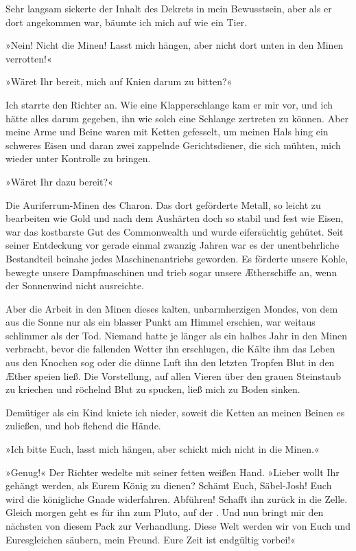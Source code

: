 Sehr langsam sickerte der Inhalt des Dekrets in mein Bewusstsein,
aber als er dort angekommen war, bäumte ich mich auf wie ein Tier.

»Nein! Nicht die Minen! Lasst mich hängen, aber nicht dort unten in
den Minen verrotten!«

»Wäret Ihr bereit, mich auf Knien darum zu bitten?«

Ich starrte den Richter an. Wie eine Klapperschlange kam er mir
vor, und ich hätte alles darum gegeben, ihn wie solch eine Schlange
zertreten zu können. Aber meine Arme und Beine waren mit Ketten
gefesselt, um meinen Hals hing ein schweres Eisen und daran zwei
zappelnde Gerichtsdiener, die sich mühten, mich wieder unter
Kontrolle zu bringen.

\bigpar

»Wäret Ihr dazu bereit?«

\bigpar

Die Auriferrum-Minen des Charon. Das dort geförderte Metall, so
leicht zu bearbeiten wie Gold und nach dem Aushärten doch so stabil
und fest wie Eisen, war das kostbarste Gut des Commonwealth und
wurde eifersüchtig gehütet. Seit seiner Entdeckung vor gerade
einmal zwanzig Jahren war es der unentbehrliche Bestandteil beinahe
jedes Maschinenantriebs geworden. Es förderte unsere Kohle, bewegte
unsere Dampfmaschinen und trieb sogar unsere Ætherschiffe an, wenn
der Sonnenwind nicht ausreichte.

Aber die Arbeit in den Minen dieses kalten, unbarmherzigen Mondes,
von dem aus die Sonne nur als ein blasser Punkt am Himmel erschien,
war weitaus schlimmer als der Tod. Niemand hatte je länger als ein
halbes Jahr in den Minen verbracht, bevor die fallenden Wetter ihn
erschlugen, die Kälte ihm das Leben aus den Knochen sog oder die
dünne Luft ihn den letzten Tropfen Blut in den Æther speien ließ.
Die Vorstellung, auf allen Vieren über den grauen Steinstaub zu
kriechen und röchelnd Blut zu spucken, ließ mich zu Boden sinken.

Demütiger als ein Kind kniete ich nieder, soweit die Ketten an
meinen Beinen es zuließen, und hob flehend die Hände.

»Ich bitte Euch, lasst mich hängen, aber schickt mich nicht in die
Minen.«

»Genug!« Der Richter wedelte mit seiner fetten weißen Hand. »Lieber
wollt Ihr gehängt werden, als Eurem König zu dienen? Schämt Euch,
Säbel-Josh! Euch wird die königliche Gnade widerfahren. Abführen!
Schafft ihn zurück in die Zelle. Gleich morgen geht es für ihn zum
Pluto, auf der . Und nun bringt mir den nächsten
von diesem Pack zur Verhandlung. Diese Welt werden wir von Euch und
Euresgleichen säubern, mein Freund. Eure Zeit ist endgültig
vorbei!«

